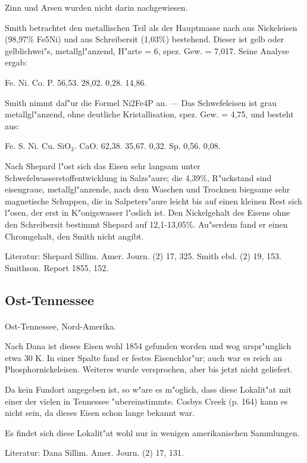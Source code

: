 \documentclass[a4paper, 11pt, oneside]{article}
\begin{document}
Zinn und Arsen wurden nicht darin nachgewiesen.

Smith betrachtet den metallischen Teil als der Hauptmasse nach aus Nickeleisen (98,97\% Fe5Ni) und aus Schreibersit (1,03\%) bestehend. Dieser ist gelb oder gelblichwei"s, metallgl"anzend, H"arte = 6, spez. Gew. = 7,017. Seine Analyse ergab:

Fe. Ni. Co. P.  
56,53. 28,02. 0,28. 14,86.

Smith nimmt daf"ur die Formel Ni2Fe4P an. --- Das Schwefeleisen ist grau metallgl"anzend, ohne deutliche Kristallisation, spez. Gew. = 4,75, und besteht aus:

Fe. S. Ni. Cu. SiO$_{3}$. CaO.
62,38. 35,67. 0,32. Sp. 0,56. 0,08.

Nach Shepard l"ost sich das Eisen sehr langsam unter Schwefelwasserstoffentwicklung in Salzs"aure; die 4,39\%, R"uckstand sind eisengraue, metallgl"anzende, nach dem Waschen und Trocknen biegsame sehr magnetische Schuppen, die in Salpeters"aure leicht bis auf einen kleinen Rest sich l"osen, der erst in K"onigswasser l"oslich ist. Den Nickelgehalt des Eisens ohne den Schreibersit bestimmt Shepard auf 12,1-13,05\%. Au"serdem fand er einen Chromgehalt, den Smith nicht angibt.

Literatur: Shepard Sillim. Amer. Journ. (2) 17, 325. Smith ebd. (2) 19, 153. Smithson. Report 1855, 152.

\subsection{Ost-Tennessee}
\normalsize
\paragraph{}
Ost-Tennessee, Nord-Amerika.

Nach Dana ist dieses Eisen wohl 1854 gefunden worden und wog urspr"unglich etwa 30 K. In einer Spalte fand er festes Eisenchlor"ur; auch war es reich an Phosphornickeleisen. Weiteres wurde versprochen, aber bis jetzt nicht geliefert.

Da kein Fundort angegeben ist, so w"are es m"oglich, dass diese Lokalit"at mit einer der vielen in Tennessee "ubereinstimmte. Cosbys Creek (p. 164) kann es nicht sein, da dieses Eisen schon lange bekannt war.

Es findet sich diese Lokalit"at wohl nur in wenigen amerikanischen Sammlungen.

Literatur: Dana Sillim. Amer. Journ. (2) 17, 131.
\end{document}
